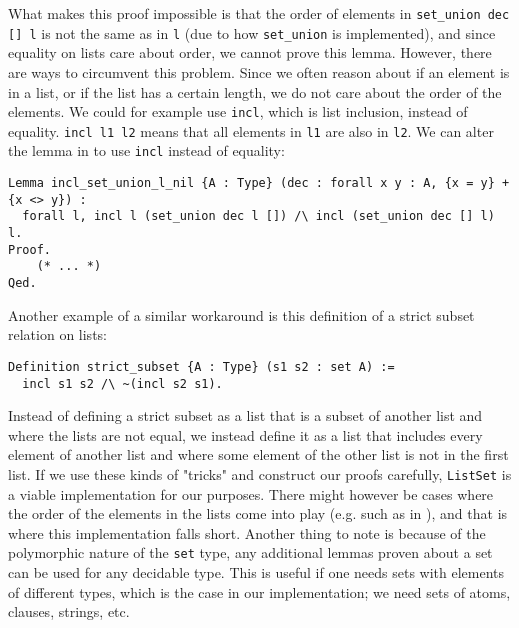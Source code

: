 What makes this proof impossible is that the order of elements in \lstinline{set_union dec [] l} is not the
same as in \lstinline{l} (due to how \lstinline{set_union} is implemented), and since equality on lists care about order,
we cannot prove this lemma.
However, there are ways to circumvent this problem.
Since we often reason about if an element is in a list, or if the list has a certain length,
we do not care about the order of the elements.
We could for example use \lstinline{incl}, which is list inclusion, instead of equality.
\lstinline{incl l1 l2} means that all elements in \lstinline{l1} are also in \lstinline{l2}.
We can alter the lemma in  to use \lstinline{incl} instead of equality:

\begin{minipage}{\linewidth}
\begin{lstlisting}[language=Coq, label={lst:set_op_ex3}, caption={Tedious, but correct lemma in \lstinline{ListSet} module using \lstinline{incl}}]
Lemma incl_set_union_l_nil {A : Type} (dec : forall x y : A, {x = y} + {x <> y}) :
  forall l, incl l (set_union dec l []) /\ incl (set_union dec [] l) l.
Proof.
    (* ... *)
Qed.
\end{lstlisting}
\end{minipage}

Another example of a similar workaround is this definition of a strict subset relation on lists:

\begin{minipage}{\linewidth}
\begin{lstlisting}[language=Coq, label={lst:subset_def}, caption={Strict subset relation on lists using \lstinline{incl}}]
Definition strict_subset {A : Type} (s1 s2 : set A) :=
  incl s1 s2 /\ ~(incl s2 s1).
\end{lstlisting}
\end{minipage}

Instead of defining a strict subset as a list that is a subset of another list and where the lists are not equal,
we instead define it as a list that includes every element of another list and where some element of
the other list is not in the first list.
If we use these kinds of "tricks" and construct our proofs carefully, \lstinline{ListSet} is a viable implementation for our purposes.
There might however be cases where the order of the elements in the lists come into play (e.g. such as in ),
and that is where this implementation falls short.
Another thing to note is because of the polymorphic nature of the \lstinline{set} type, any additional lemmas proven about a set can be
used for any decidable type. This is useful if one needs sets with elements of different types,
which is the case in our implementation; we need sets of atoms, clauses, strings, etc.

